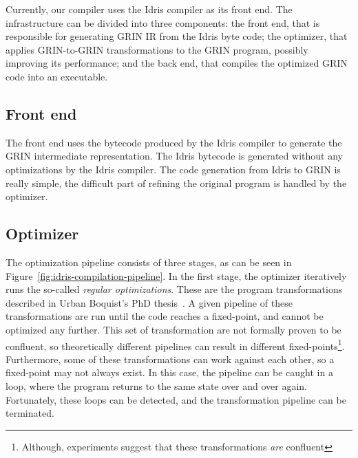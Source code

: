 \documentclass[main.tex]{subfiles}
\begin{document}
	
	Currently, our compiler uses the Idris compiler as its front end. The infrastructure can be divided into three components: the front end, that is responsible for generating GRIN IR from the Idris byte code; the optimizer, that applies GRIN-to-GRIN transformations to the GRIN program, possibly improving its performance; and the back end, that compiles the optimized GRIN code into an executable.
	
	\subsection{Front end}
	
	The front end uses the bytecode produced by the Idris compiler to generate the GRIN intermediate representation. The Idris bytecode is generated without any optimizations by the Idris compiler. The code generation from Idris to GRIN is really simple, the difficult part of refining the original program is handled by the optimizer. 
	
	\subsection{Optimizer}
	\label{subsec:optimizer}
	
	The optimization pipeline consists of three stages, as can be seen in Figure~\ref{fig:idris-compilation-pipeline}. In the first stage, the optimizer iteratively runs the so-called \textit{regular optimizations}. These are the program transformations described in Urban Boquist's PhD thesis~\cite{boquist-phd}. A given pipeline of these transformations are run until the code reaches a fixed-point, and cannot be optimized any further. This set of transformation are not formally proven to be confluent, so theoretically different pipelines can result in different fixed-points\footnote{Although, experiments suggest that these transformations \textit{are} confluent}. Furthermore, some of these transformations can work against each other, so a fixed-point may not always exist. In this case, the pipeline can be caught in a loop, where the program returns to the same state over and over again. Fortunately, these loops can be detected, and the transformation pipeline can be terminated. 
	
	\begin{figure}[t] 
		\centering
		
	\end{figure}
	
\end{document}
